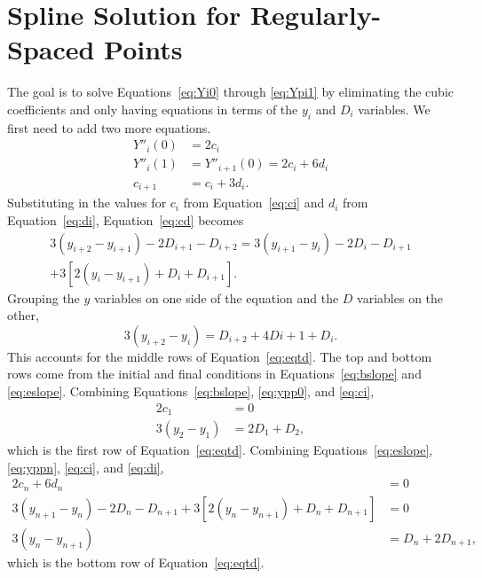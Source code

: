 \documentclass{scrartcl}
\begin{document}
\appendix
\section{Spline Solution for Regularly-Spaced Points}\label{sec:reg-deriv}
The goal is to solve Equations~\ref{eq:Yi0} through \ref{eq:Ypi1}
by eliminating the cubic coefficients and only having equations
in terms of the $y_i$ and $D_i$ variables. We first need to
add two more equations.
\begin{align}
Y''_i(0) &= 2c_i\label{eq:ypp0}\\
Y''_i(1) &= Y''_{i+1}(0) = 2c_i+6d_i\label{eq:yppn}\\
c_{i+1} &= c_i + 3d_i. \label{eq:cd}
\end{align}
Substituting in the values for $c_i$ from Equation~\ref{eq:ci} and
$d_i$ from Equation~\ref{eq:di}, Equation~\ref{eq:cd} becomes
\begin{multline}
3(y_{i+2}-y_{i+1})-2D_{i+1}-D_{i+2} = 3(y_{i+1}-y_i)-2D_i-D_{i+1}\\
	+3[2(y_i-y_{i+1})+D_i+D_{i+1}].
\end{multline}
Grouping the $y$ variables on one side of the equation and the $D$
variables on the other,
\begin{equation}
3(y_{i+2}-y_i) = D_{i+2} +4D{i+1} +D_i.
\end{equation}
This accounts for the middle rows of Equation~\ref{eq:eqtd}. The
top and bottom rows come from the initial and final conditions
in Equations~\ref{eq:bslope} and \ref{eq:eslope}. Combining
Equations~\ref{eq:bslope}, \ref{eq:ypp0}, and \ref{eq:ci},
\begin{align}
2c_1 & = 0\\
3(y_2-y_1) &= 2D_1 + D_2,
\end{align}
which is the first row of Equation~\ref{eq:eqtd}. Combining
Equations~\ref{eq:eslope}, \ref{eq:yppn}, \ref{eq:ci}, and
\ref{eq:di},
\begin{align}
2c_n+6d_n &= 0\\
3(y_{n+1}-y_n)-2D_n-D_{n+1}+3[2(y_n-y_{n+1})+D_n+D_{n+1}] &= 0\\
3(y_n-y_{n+1}) &= D_n+2D_{n+1},
\end{align}
which is the bottom row of Equation~\ref{eq:eqtd}.
\end{document}
